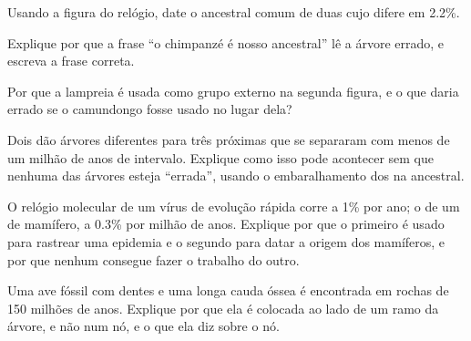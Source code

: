 \begin{exercise}[$\star\star$]\label{exo:g12:phylogenetic-trees:9}
Usando a figura do relógio, date o ancestral comum de duas 
cujo  difere em 2.2\%.
\end{exercise}

\begin{exercise}[$\star\star$]\label{exo:g12:phylogenetic-trees:10}
Explique por que a frase ``o chimpanzé é nosso ancestral'' lê a árvore
errado, e escreva a frase correta.
\end{exercise}

\begin{exercise}[$\star\star$]\label{exo:g12:phylogenetic-trees:11}
Por que a lampreia é usada como grupo externo na segunda figura, e o
que daria errado se o camundongo fosse usado no lugar dela?
\end{exercise}

\begin{exercise}[$\star\star\star$]\label{exo:g12:phylogenetic-trees:12}
Dois  dão árvores diferentes para três  próximas que se
separaram com menos de um milhão de anos de intervalo. Explique como
isso pode acontecer sem que nenhuma das árvores esteja ``errada'',
usando o embaralhamento dos  na  ancestral.
\end{exercise}

\begin{exercise}[$\star\star\star$]\label{exo:g12:phylogenetic-trees:13}
O relógio molecular de um vírus de evolução rápida corre a 1\% por ano;
o de um  de mamífero, a 0.3\% por milhão de anos. Explique por que
o primeiro é usado para rastrear uma epidemia e o segundo para datar a
origem dos mamíferos, e por que nenhum consegue fazer o trabalho do outro.
\end{exercise}

\begin{exercise}[$\star\star\star$]\label{exo:g12:phylogenetic-trees:14}
Uma ave fóssil com dentes e uma longa cauda óssea é encontrada em
rochas de 150 milhões de anos. Explique por que ela é colocada ao lado
de um ramo da árvore, e não num nó, e o que ela diz sobre o nó.
\end{exercise}

